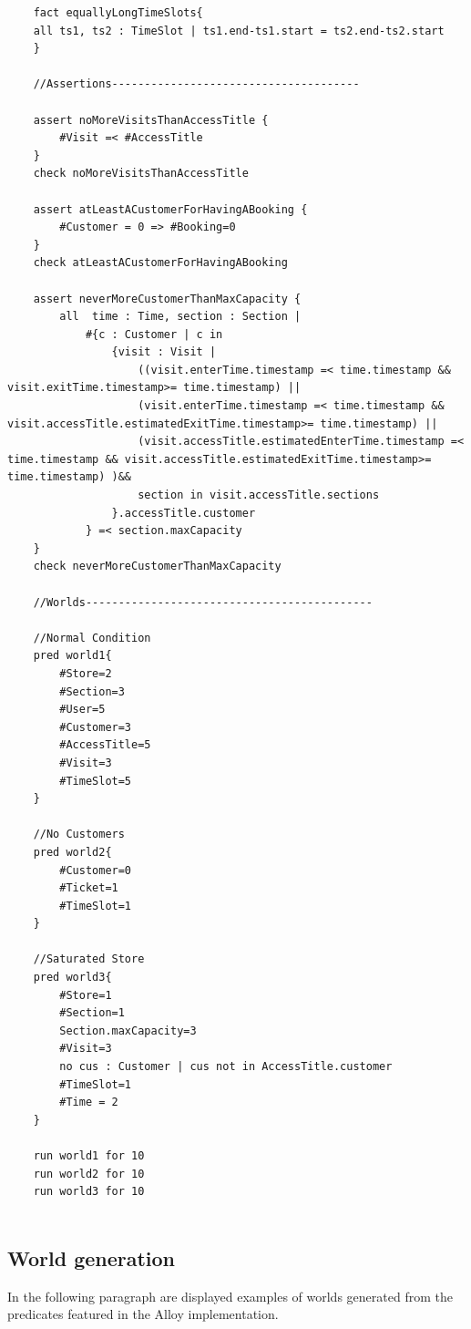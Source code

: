 \begin{lstlisting}
    fact equallyLongTimeSlots{
    all ts1, ts2 : TimeSlot | ts1.end-ts1.start = ts2.end-ts2.start
    }

    //Assertions--------------------------------------

    assert noMoreVisitsThanAccessTitle {
        #Visit =< #AccessTitle
    }
    check noMoreVisitsThanAccessTitle

    assert atLeastACustomerForHavingABooking {
        #Customer = 0 => #Booking=0
    }
    check atLeastACustomerForHavingABooking

    assert neverMoreCustomerThanMaxCapacity {
        all  time : Time, section : Section |
            #{c : Customer | c in
                {visit : Visit |
                    ((visit.enterTime.timestamp =< time.timestamp && visit.exitTime.timestamp>= time.timestamp) ||
                    (visit.enterTime.timestamp =< time.timestamp && visit.accessTitle.estimatedExitTime.timestamp>= time.timestamp) ||
                    (visit.accessTitle.estimatedEnterTime.timestamp =< time.timestamp && visit.accessTitle.estimatedExitTime.timestamp>= time.timestamp) )&&
                    section in visit.accessTitle.sections
                }.accessTitle.customer
            } =< section.maxCapacity
    }
    check neverMoreCustomerThanMaxCapacity

    //Worlds--------------------------------------------

    //Normal Condition
    pred world1{
        #Store=2
        #Section=3
        #User=5
        #Customer=3
        #AccessTitle=5
        #Visit=3
        #TimeSlot=5
    }

    //No Customers
    pred world2{
        #Customer=0
        #Ticket=1
        #TimeSlot=1
    }

    //Saturated Store
    pred world3{
        #Store=1
        #Section=1
        Section.maxCapacity=3
        #Visit=3
        no cus : Customer | cus not in AccessTitle.customer
        #TimeSlot=1
        #Time = 2
    }

    run world1 for 10
    run world2 for 10
    run world3 for 10


\end{lstlisting}

\subsection{World generation}

In the following paragraph are displayed examples of worlds generated
from the predicates featured in the Alloy implementation.

